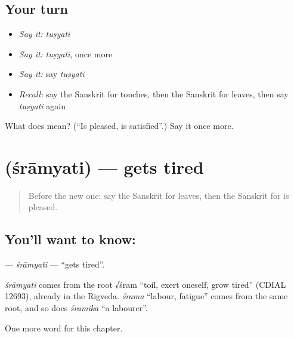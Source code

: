 \subsection*{Your turn}
\begin{itemize}
\raggedright
  \item \emph{Say it:} \emph{tuṣyati}
  \item \emph{Say it:} \emph{tuṣyati}, once more
  \item \emph{Say it:} say \emph{tuṣyati}
  \item \emph{Recall:} say the Sanskrit for touches, then the Sanskrit for leaves, then say \emph{tuṣyati} again
\end{itemize}

\begin{tcolorbox}[breakable,colback=teal!4,colframe=teal!35!black,title={Before you move on}]
What does  mean? (\textquotedblleft{}Is pleased, is satisfied\textquotedblright{}.) Say it once more.
\end{tcolorbox}
\section[\texorpdfstring{\sk{श्राम्यति} (śrāmyati)}{श्राम्यति (śrāmyati)}]{ (śrāmyati) — gets tired}

\label{lesson:SA-C142-sramyati}



\begin{quote}
Before the new one: say the Sanskrit for leaves, then the Sanskrit for is pleased.
\end{quote}

\subsection*{You'll want to know: }
\textbf{} — \emph{śrāmyati} — \textquotedblleft{}gets tired\textquotedblright{}.

\begin{cousinweb}
\emph{śrāmyati} comes from the root √śram \textquotedblleft{}toil, exert oneself, grow tired\textquotedblright{} (CDIAL 12693), already in the Rigveda. \emph{śrama} \textquotedblleft{}labour, fatigue\textquotedblright{} comes from the same root, and so does \emph{śramika} \textquotedblleft{}a labourer\textquotedblright{}.
\end{cousinweb}

\begin{grammarlens}[title={What you've built}]
One more word for this chapter.
\end{grammarlens}

